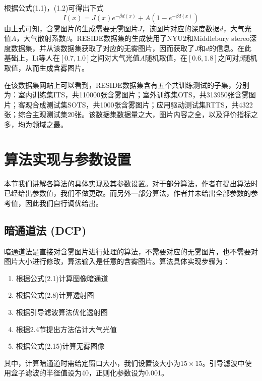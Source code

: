 \documentclass[a4paper, 12pt, oneside]{report}
\begin{document}
{根据公式(1.1)，(1.2)可得出下式
\begin{equation}
I(x) = J(x) e^{-\beta d(x)} + A(1 - e^{-\beta d(x)})
\end{equation}
由上式可知，含雾图片的生成需要无雾图片$J$，该图片对应的深度数据$d$，大气光值$A$，大气散射系数$\beta$。RESIDE数据集的生成使用了NYU2\cite{ref22}和Middlebury stereo\cite{ref23}深度数据集，并从该数据集获取了对应的无雾图片，因而获取了$J$和$d$的信息。在此基础上，Li等人在$[0.7, 1.0]$之间对大气光值$A$随机取值，在$[0.6, 1.8]$之间对$\beta$随机取值，从而生成含雾图片。

在该数据集网站上可以看到，RESIDE数据集含有五个共训练测试的子集，分别为：室内训练集ITS，共110000张含雾图片；室外训练集OTS，共313950张含雾图片；客观合成测试集SOTS，共1000张含雾图片；应用驱动测试集RTTS，共4322张；综合主观测试集20张。该数据集数据量之大，图片内容之全，以及评价指标之多，均为领域之最。

\section{算法实现与参数设置\quad}
本节我们讲解各算法的具体实现及其参数设置。对于部分算法，作者在提出算法时已经给出参数值，我们不做更改。而另外一部分算法，作者并未给出全部参数的参考值，因此我们自行调优给出。

\subsection{暗通道法 (DCP)\quad}
	暗通道法是直接对含雾图片进行处理的算法，不需要对应的无雾图片，也不需要对图片大小进行修改，算法输入是任意的含雾图片。算法具体实现步骤为：
\begin{enumerate}
\item 根据公式(2.1)计算图像暗通道
\item 根据公式(2.8)计算透射图
\item 根据引导滤波算法优化透射图
\item 根据2.4节提出方法估计大气光值
\item 根据公式(2.15)计算无雾图像
\end{enumerate}

其中，计算暗通道时需给定窗口大小，我们设置该大小为$15\times 15$。引导滤波中使用盒子滤波的半径值设为40，正则化参数设为0.001。

}
\end{document}

